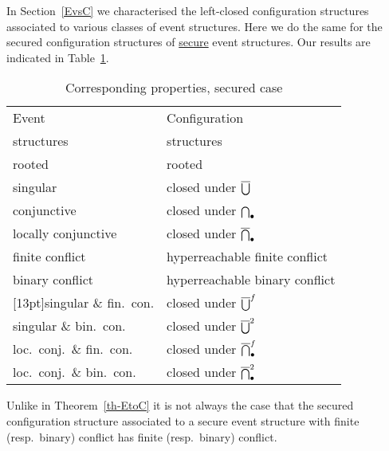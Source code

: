 \documentclass[twocolumn]{article}
\newcommand{\out}[1]{}        \newcommand{\ams}[1]{#1}      \usepackage[preserveurlmacro]{breakurl}
\newcommand{\thm}[1]{Theorem~\ref{th-#1}}
\begin{document}
In Section~\ref{EvsC} we characterised the left-closed configuration
structures associated to various classes of event structures.
Here we do the same for the secured configuration structures of
\hyperref[secure]{secure} event structures.
Our results are indicated in Table~\ref{correspondence secured}.
\begin{table}[htb]
\begin{tabular}{@{}|@{~}l@{\,}|@{~}l@{\,}|@{}}
\hline
Event			& Configuration             \\
structures		& structures                \\
\hline\hline
rooted			& rooted                    \\
singular		& closed under $\overline{\bigcup}$   \\
conjunctive		& closed under $\bigcap_{\bullet}$   \\
locally conjunctive	& closed under $\overline{\bigcap}_{\bullet}$  \\
finite conflict 	& hyperreachable finite conflict \\
binary conflict		& hyperreachable binary conflict \\
\hline
\raisebox{0pt}[13pt]{singular} \& fin.\ con.	& closed under $\overline{\bigcup}^f$  \\
singular \& bin.\ con.	& closed under $\overline{\bigcup}^2$  \\
loc.\ conj.\ \& fin.\ con.& closed under $\overline{\bigcap}_{\bullet}^f$\\
loc.\ conj.\ \& bin.\ con.& closed under $\overline{\bigcap}_{\bullet}^2$\\
\hline
\end{tabular}
\caption{Corresponding properties, secured case\label{correspondence secured}}
\end{table}
\out{
 The two question marks indicate that we are not sure about the
 implications from left to right, i.e., whether the secured configuration
 structure associated to a (locally) conjunctive event structure $\eE$
 is always closed under (bounded) nonempty intersections. We are sure
 about these implications in case $S(\eE) \subseteq L(\eE)$, which
 is surely the case if $\eE$ has finite conflict.
}

Unlike in \thm{EtoC} it is not always the case that the secured
configuration structure associated to a secure event
structure with finite (resp.\ binary) conflict has finite (resp.\
binary) conflict.
\end{document}
